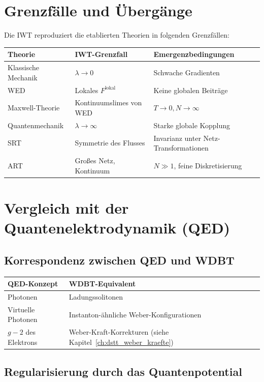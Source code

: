 \section{Grenzfälle und Übergänge}
\label{app:vergleich_grenzfaelle}

Die IWT reproduziert die etablierten Theorien in folgenden Grenzfällen:

\begin{tabular}{|l|l|l|}
\hline
\textbf{Theorie} & \textbf{IWT-Grenzfall} & \textbf{Emergenzbedingungen} \\
\hline
Klassische Mechanik & \( \lambda \to 0 \) & Schwache Gradienten \\
WED & Lokales \( F^{\text{lokal}} \) & Keine globalen Beiträge \\
Maxwell-Theorie & Kontinuumslimes von WED & \( T \to 0, N \to \infty \) \\
Quantenmechanik & \( \lambda \to \infty \) & Starke globale Kopplung \\
SRT & Symmetrie des Flusses & Invarianz unter Netz-Transformationen \\
ART & Großes Netz, Kontinuum & \( N \gg 1 \), feine Diskretisierung \\
\hline
\end{tabular}

\section{Vergleich mit der Quantenelektrodynamik (QED)}
\label{app:vergleich_qed}

\subsection{Korrespondenz zwischen QED und WDBT}
\label{sub:vergleich_qed_korrespondenz}

\begin{tabular}{|l|l|}
\hline
\textbf{QED-Konzept} & \textbf{WDBT-Equivalent} \\
\hline
Photonen & Ladungssolitonen \\
Virtuelle Photonen & Instanton-ähnliche Weber-Konfigurationen \\
\( g-2 \) des Elektrons & Weber-Kraft-Korrekturen (siehe Kapitel~\ref{ch:dstt_weber_kraefte}) \\
\hline
\end{tabular}

\subsection{Regularisierung durch das Quantenpotential}
\label{sub:vergleich_qed_regularisierung}

